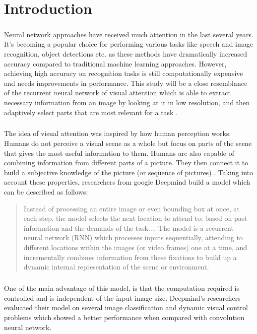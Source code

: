 \chapter{Introduction}
\label{chap:intro}
\paragraph{} Neural network approaches have received much attention in the last several years.
It's becoming a popular choice for performing various tasks like speech and image recognition,
object detections etc. as these methods have dramatically increased accuracy
compared to traditional machine learning approaches.
However, achieving high accuracy on recognition tasks is still computationally
expensive and needs improvements in performance.
This study will be a close resemblance of the recurrent neural network of visual attention which is able to extract necessary
information from an image by looking at it in low resolution, and then
adaptively select parts that are most relevant for a task \cite{Mnih2014}.

 \paragraph{} The idea of visual attention was inspired by how human perception works.
 Humans do not perceive a visual scene as a whole but focus on parts of
 the scene that gives the most useful information to them.
 Humans are also capable of combining information from different parts of a picture.
 They then connect it to build a subjective knowledge of the picture (or sequence of pictures) \cite{Goldsborough}.
Taking into account these properties, researchers from google
Deepmind build a model which can be described as follows:
 \blockquote{
 	Instead of processing an entire image or even bounding box at once,
 	at each step, the model selects the next location to attend to;
	based on past information and the demands of the task....
	The model is a recurrent neural network (RNN) which processes
	inputs sequentially, attending to different locations within the
	images (or video frames) one at a time, and incrementally combines
	information from these fixations to build up a dynamic internal
	representation of the scene or environment.\cite{Mnih2014}
}

 \paragraph{} One of the main advantage of this model, is that the computation required is
 controlled and is independent of the input image size.
 Deepmind’s researchers evaluated their model on several image classification
 and dynamic visual control problems which showed a better performance when
 compared with convolution neural network\cite{Goldsborough}.

